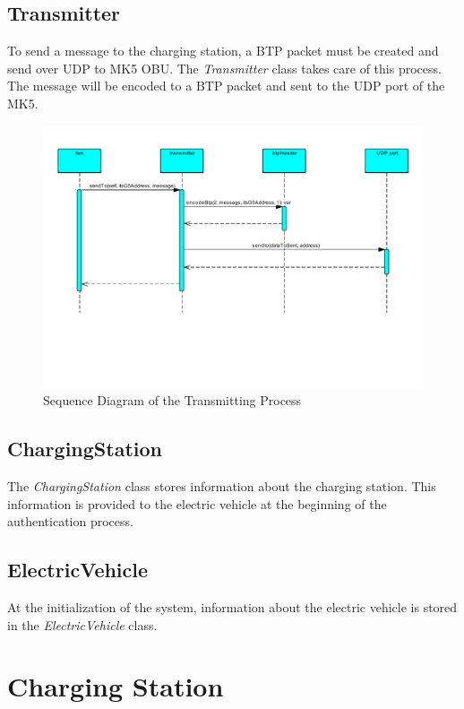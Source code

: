 \subsection{Transmitter}

To send a message to the charging station, a BTP packet must be created and send over UDP to MK5 OBU. The \textit{Transmitter} class takes care of this process. The message will be encoded to a BTP packet and sent to the UDP port of the MK5.

\begin{figure}[htb]
	\centering
	\includegraphics[width=1\textwidth]{images/transmit}
	\caption{Sequence Diagram of the Transmitting Process}
	\label{fig:sequence_diagram_transmit}
\end{figure}

\subsection{ChargingStation}

The \textit{ChargingStation} class stores information about the charging station. This information is provided to the electric vehicle at the beginning of the authentication process.

\subsection{ElectricVehicle}

At the initialization of the system, information about the electric vehicle is stored in the \textit{ElectricVehicle} class.

\newpage

\section{Charging Station}

